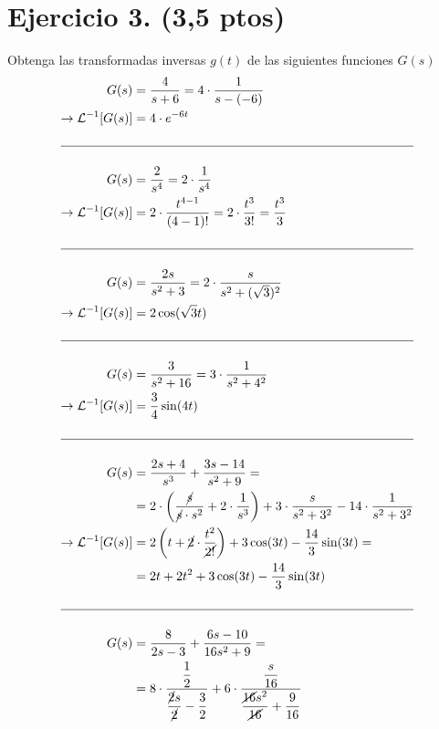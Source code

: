 \documentclass{article}
\begin{document}
\section*{Ejercicio 3. (3,5 ptos)}
Obtenga las transformadas inversas $g(t)$ de las siguientes funciones $G(s)$
\begin{align*}
    G(s) 
    &= \dfrac{4}{s + 6}
    = 4 \cdot \dfrac{1}{s - (-6)} \\
    \rightarrow\mathcal{L}^{-1}[G(s)]&
    = 4 \cdot e^{-6t} \\
    \\ \hline \\
    G(s) 
    &= \dfrac{2}{s^4}
    = 2 \cdot \dfrac{1}{s^4} \\
    \rightarrow\mathcal{L}^{-1}[G(s)]&
    = 2 \cdot \dfrac{t^{4-1}}{(4-1)!}
    = 2 \cdot \dfrac{t^{3}}{3!}
    = \dfrac{t^3}{3} \\    
    \\ \hline \\
    G(s) 
    &= \dfrac{2s}{s^2 + 3}
    = 2 \cdot \dfrac{s}{s^2 + (\sqrt{3})^2} \\
    \rightarrow\mathcal{L}^{-1}[G(s)]&
    = 2 \cos(\sqrt{3}t) \\
    \\ \hline \\
    G(s) 
    &= \dfrac{3}{s^2 + 16}
    = 3 \cdot \dfrac{1}{s^2 + 4^2} \\
    \rightarrow\mathcal{L}^{-1}[G(s)]&
    = \dfrac{3}{4} \sin(4t) \\
    \\ \hline \\
    G(s) 
    &= \dfrac{2s + 4}{s^3} + \dfrac{3s - 14}{s^2 + 9} = \\
    &= 2 \cdot \left(\dfrac{\cancel{s}}{\cancel{s} \cdot s^2} + 2 \cdot \dfrac{1}{s^3}\right) 
    + 3 \cdot \dfrac{s}{s^2 + 3^2}
    - 14 \cdot \dfrac{1}{s^2 + 3^2} \\
    \rightarrow\mathcal{L}^{-1}[G(s)]&
    = 2 \left(t + \cancel{2} \cdot \dfrac{t^2}{\cancel{2!}}\right)
    + 3 \cos(3t)
    - \dfrac{14}{3} \sin(3t) = \\
    &= 2t + 2t^2 + 3\cos(3t) - \dfrac{14}{3} \sin(3t) \\    
    \\ \hline \\
    G(s) 
    &= \dfrac{8}{2s - 3} 
    + \dfrac{6s - 10}{16s^2 + 9} = \\
    &= 8 \cdot \dfrac{\dfrac{1}{2}}{\dfrac{\cancel{2}s}{\cancel{2}} - \dfrac{3}{2}}
    + 6 \cdot \dfrac{\dfrac{s}{16}}{\dfrac{\cancel{16}s^2}{\cancel{16}} + \dfrac{9}{16}} 

\end{align*}
\end{document}
